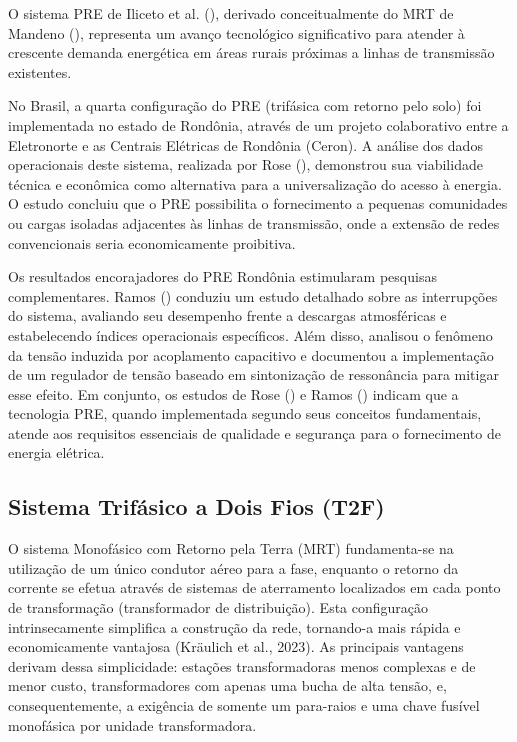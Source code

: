 \documentclass[oneside,openright,12pt]{ufsm_2021} %
\begin{document}
\par O sistema PRE de Iliceto et al. (\citeyear{iliceto_new_1989}), derivado conceitualmente do MRT de Mandeno (\citeyear{mandeno_rural_1947}), representa um avanço tecnológico significativo para atender à crescente demanda energética em áreas rurais próximas a linhas de transmissão existentes.

\par No Brasil, a quarta configuração do PRE (trifásica com retorno pelo solo) foi implementada no estado de Rondônia, através de um projeto colaborativo entre a Eletronorte e as Centrais Elétricas de Rondônia (Ceron). A análise dos dados operacionais deste sistema, realizada por Rose (\citeyear{rose_alimentacao_1997}), demonstrou sua viabilidade técnica e econômica como alternativa para a universalização do acesso à energia. O estudo concluiu que o PRE possibilita o fornecimento a pequenas comunidades ou cargas isoladas adjacentes às linhas de transmissão, onde a extensão de redes convencionais seria economicamente proibitiva.

\par Os resultados encorajadores do PRE Rondônia estimularam pesquisas complementares. Ramos (\citeyear{ramos_universalizacao_2010}) conduziu um estudo detalhado sobre as interrupções do sistema, avaliando seu desempenho frente a descargas atmosféricas e estabelecendo índices operacionais específicos. Além disso, analisou o fenômeno da tensão induzida por acoplamento capacitivo e documentou a implementação de um regulador de tensão baseado em sintonização de ressonância para mitigar esse efeito. Em conjunto, os estudos de Rose (\citeyear{rose_alimentacao_1997}) e Ramos (\citeyear{ramos_universalizacao_2010}) indicam que a tecnologia PRE, quando implementada segundo seus conceitos fundamentais, atende aos requisitos essenciais de qualidade e segurança para o fornecimento de energia elétrica.

\pagebreak

\subsection{Sistema Trifásico a Dois Fios (T2F)}

\par O sistema Monofásico com Retorno pela Terra (MRT) fundamenta-se na utilização de um único condutor aéreo para a fase, enquanto o retorno da corrente se efetua através de sistemas de aterramento localizados em cada ponto de transformação (transformador de distribuição). Esta configuração intrinsecamente simplifica a construção da rede, tornando-a mais rápida e economicamente vantajosa (Kräulich et al., 2023). As principais vantagens derivam dessa simplicidade: estações transformadoras menos complexas e de menor custo, transformadores com apenas uma bucha de alta tensão, e, consequentemente, a exigência de somente um para-raios e uma chave fusível monofásica por unidade transformadora.
\end{document}
